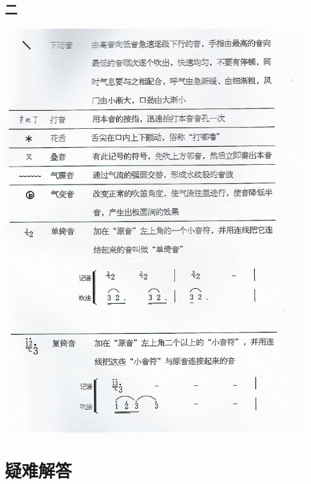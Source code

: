 \documentclass[cn,pad,chinese,chinesefont=nofont]{elegantbook}
\begin{document}
\section{二}
\includegraphics[width=\textwidth]{dongxiao/Scan 25.jpeg}

\chapter{疑难解答}
\end{document}
